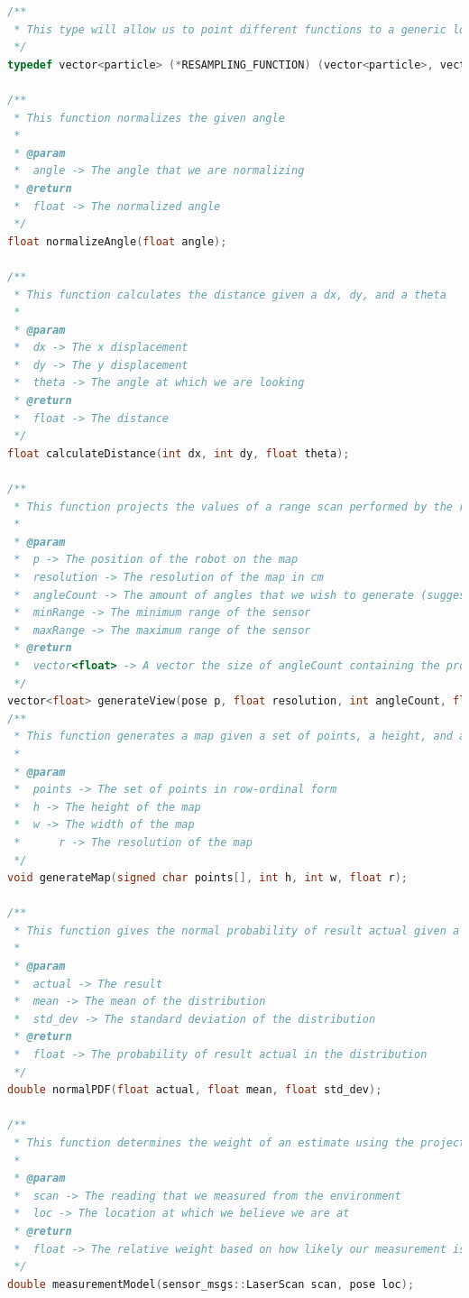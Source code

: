 \documentclass{article}
\begin{document}
\begin{appendices}
\begin{lstlisting}[language=C++]
/**
 * This type will allow us to point different functions to a generic localization function
 */
typedef vector<particle> (*RESAMPLING_FUNCTION) (vector<particle>, vector<double>);

/**
 * This function normalizes the given angle
 *
 * @param
 * 	angle -> The angle that we are normalizing
 * @return
 * 	float -> The normalized angle
 */
float normalizeAngle(float angle);

/**
 * This function calculates the distance given a dx, dy, and a theta
 *
 * @param
 * 	dx -> The x displacement
 * 	dy -> The y displacement
 * 	theta -> The angle at which we are looking
 * @return
 * 	float -> The distance
 */
float calculateDistance(int dx, int dy, float theta);

/**
 * This function projects the values of a range scan performed by the robot
 *
 * @param
 * 	p -> The position of the robot on the map
 * 	resolution -> The resolution of the map in cm
 * 	angleCount -> The amount of angles that we wish to generate (suggested is 61, to scan +- 30 degrees from direction in pose
 * 	minRange -> The minimum range of the sensor
 * 	maxRange -> The maximum range of the sensor
 * @return
 * 	vector<float> -> A vector the size of angleCount containing the projected distance values
 */
vector<float> generateView(pose p, float resolution, int angleCount, float startAngle, float angleResolution);
/**
 * This function generates a map given a set of points, a height, and a width, setting it to the global variable
 *
 * @param
 * 	points -> The set of points in row-ordinal form
 * 	h -> The height of the map
 * 	w -> The width of the map
 *      r -> The resolution of the map
 */
void generateMap(signed char points[], int h, int w, float r);

/**
 * This function gives the normal probability of result actual given a mean and a standard deviation
 *
 * @param
 * 	actual -> The result
 * 	mean -> The mean of the distribution
 * 	std_dev -> The standard deviation of the distribution
 * @return
 * 	float -> The probability of result actual in the distribution
 */
double normalPDF(float actual, float mean, float std_dev);

/**
 * This function determines the weight of an estimate using the projected view and the actual view
 *
 * @param
 * 	scan -> The reading that we measured from the environment
 * 	loc -> The location at which we believe we are at
 * @return
 * 	float -> The relative weight based on how likely our measurement is given our position
 */
double measurementModel(sensor_msgs::LaserScan scan, pose loc);


\end{lstlisting}
\end{appendices}
\end{document}
